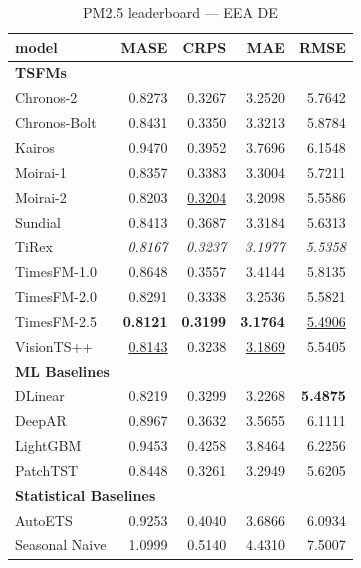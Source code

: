 \begin{table}[H]
\caption{PM2.5 leaderboard --- EEA DE}
\centering
\begin{small}
\begin{tabular}{lrrrr}
\toprule
model & MASE & CRPS & MAE & RMSE \\
\midrule
\multicolumn{5}{l}{\textbf{TSFMs}} \\
Chronos-2 & 0.8273 & 0.3267 & 3.2520 & 5.7642 \\
Chronos-Bolt & 0.8431 & 0.3350 & 3.3213 & 5.8784 \\
Kairos & 0.9470 & 0.3952 & 3.7696 & 6.1548 \\
Moirai-1 & 0.8357 & 0.3383 & 3.3004 & 5.7211 \\
Moirai-2 & 0.8203 & \underline{0.3204} & 3.2098 & 5.5586 \\
Sundial & 0.8413 & 0.3687 & 3.3184 & 5.6313 \\
TiRex & \textit{0.8167} & \textit{0.3237} & \textit{3.1977} & \textit{5.5358} \\
TimesFM-1.0 & 0.8648 & 0.3557 & 3.4144 & 5.8135 \\
TimesFM-2.0 & 0.8291 & 0.3338 & 3.2536 & 5.5821 \\
TimesFM-2.5 & \textbf{0.8121} & \textbf{0.3199} & \textbf{3.1764} & \underline{5.4906} \\
VisionTS++ & \underline{0.8143} & 0.3238 & \underline{3.1869} & 5.5405 \\
\midrule
\multicolumn{5}{l}{\textbf{ML Baselines}} \\
DLinear & 0.8219 & 0.3299 & 3.2268 & \textbf{5.4875} \\
DeepAR & 0.8967 & 0.3632 & 3.5655 & 6.1111 \\
LightGBM & 0.9453 & 0.4258 & 3.8464 & 6.2256 \\
PatchTST & 0.8448 & 0.3261 & 3.2949 & 5.6205 \\
\midrule
\multicolumn{5}{l}{\textbf{Statistical Baselines}} \\
AutoETS & 0.9253 & 0.4040 & 3.6866 & 6.0934 \\
Seasonal Naive & 1.0999 & 0.5140 & 4.4310 & 7.5007 \\
\bottomrule
\end{tabular}
\end{small}
\end{table}